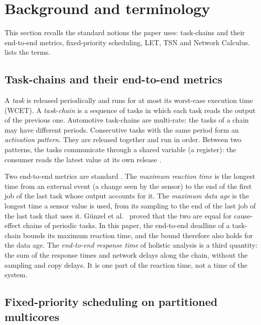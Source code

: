 \section{Background and terminology}
\label{sec:background}

\begin{inbrief}
This section recalls the standard notions the paper uses: task-chains
and their end-to-end metrics, fixed-priority scheduling, LET, TSN and
Network Calculus.  lists the terms.
\end{inbrief}

\subsection{Task-chains and their end-to-end metrics}

A \emph{task} is released periodically and runs for at most its
worst-case execution time (WCET). A \emph{task-chain} is a sequence of
tasks in which each task reads the output of the previous one. Automotive
task-chains are multi-rate: the tasks of a chain may have different
periods. Consecutive tasks with the same period form an \emph{activation
pattern}. They are released together and run in order. Between two
patterns, the tasks communicate through a shared variable (a register):
the consumer reads the latest value at its own release
\cite{kramer2015waters,hamann2017communication}.

Two end-to-end metrics are standard \cite{feiertag2008compositional,
becker2017end,durr2019end}. The \emph{maximum reaction time} is the
longest time from an external event (a change seen by the sensor) to the
end of the first job of the last task whose output accounts for it. The
\emph{maximum data age} is the longest time a sensor value is used, from
its sampling to the end of the last job of the last task that uses it.
Günzel et al.~\cite{gunzel2023equivalence} proved that the two are equal
for cause-effect chains of periodic tasks. In this paper, the end-to-end deadline of a
task-chain bounds its maximum reaction time, and the bound therefore also
holds for the data age. The \emph{end-to-end response time} of holistic
analysis \cite{tindell1994holistic} is a third quantity: the sum of the
response times and network delays along the chain, without the sampling
and copy delays. It is one part of the reaction time, not a time of the
system.

\subsection{Fixed-priority scheduling on partitioned multicores}

